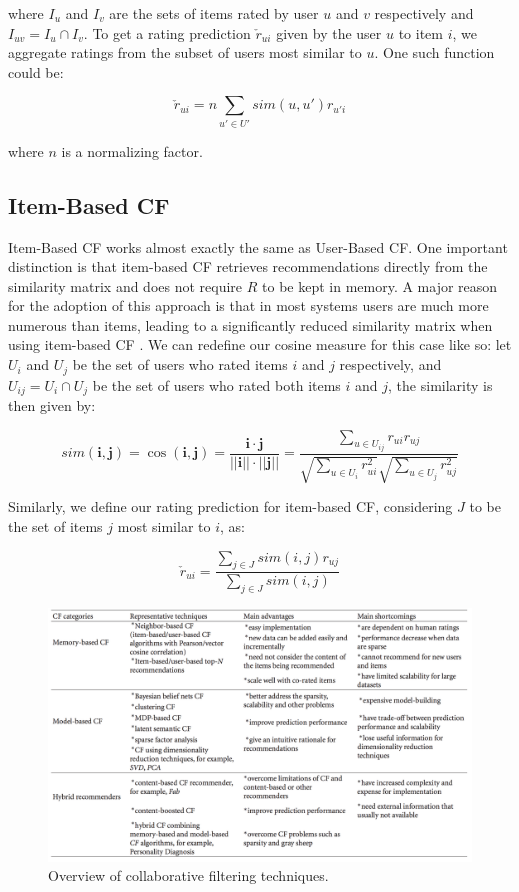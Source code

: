 \documentclass[cic,tc,english]{iiufrgs}
\begin{document}
where $I_u$ and $I_v$ are the sets of items rated by user $u$ and $v$ respectively and $I_{uv} = I_u \cap I_v$. 
To get a rating prediction $\check{r}_{ui}$ given by the user $u$ to item $i$, we aggregate ratings from the subset of users most similar to $u$. One such function could be:

$$
\check{r}_{ui} = n \sum_{u' \in U'} sim(u, u')r_{u'i}
$$

where $n$ is a normalizing factor.

\subsection{Item-Based CF}
Item-Based CF works almost exactly the same as User-Based CF. One important distinction is that item-based CF retrieves recommendations directly from the similarity matrix and does not require $R$ to be kept in memory. A major reason for the adoption of this approach is that in most systems users are much more numerous than items, leading to a significantly reduced similarity matrix when using item-based CF \cite{Sarwar2001}. We can redefine our cosine measure for this case like so: let $U_i$ and $U_j$ be the set of users who rated items $i$ and $j$ respectively, and $U_{ij} = U_i \cap U_j$ be the set of users who rated both items $i$ and $j$, the similarity is then given by:


\[sim(\pmb i, \pmb j) = \cos(\pmb i, \pmb j) = \frac {\pmb i \cdot \pmb j}{||\pmb i|| \cdot ||\pmb j||} = \frac{\sum_{u \in U_{ij}} r_{ui}r_{uj}}{\sqrt{\sum_{u \in U_i} r_{ui}^2}\sqrt{\sum_{u \in U_j} r_{uj}^2}}\]

Similarly, we define our rating prediction for item-based CF, considering $J$ to be the set of items $j$ most similar to $i$, as:

$$
\check{r}_{ui} = \frac{\sum_{j \in J} sim(i, j)r_{uj}}{\sum_{j \in J} sim(i, j)}
$$

\begin{figure}
    \caption{Overview of collaborative filtering techniques.}
    \begin{center}
        \includegraphics[width=35em]{cf-comparison}
    \end{center}
    \label{fig:cf-comparison}
\end{figure}
\end{document}
